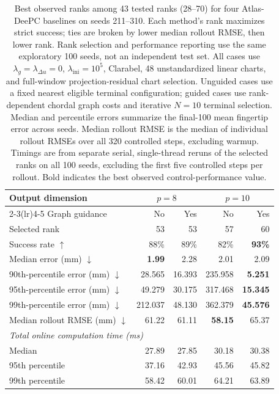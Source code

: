 \begin{table}[htbp]
    \centering
    \small
    \begin{tabular}{lrrrr}
        \toprule
        Output dimension & \multicolumn{2}{c}{$p=8$} & \multicolumn{2}{c}{$p=10$} \\
        \cmidrule(lr){2-3}\cmidrule(lr){4-5}
        Graph guidance & No & Yes & No & Yes \\
        \midrule
        Selected rank & 53 & 53 & 57 & 60 \\
        Success rate $\uparrow$ & 88\% & 89\% & 82\% & \textbf{93\%} \\
        Median error (mm) $\downarrow$ & \textbf{1.99} & 2.28 & 2.01 & 2.09 \\
        90th-percentile error (mm) $\downarrow$ & 28.565 & 16.393 & 235.958 & \textbf{5.251} \\
        95th-percentile error (mm) $\downarrow$ & 49.279 & 30.175 & 317.468 & \textbf{15.345} \\
        99th-percentile error (mm) $\downarrow$ & 212.037 & 48.130 & 362.379 & \textbf{45.576} \\
        Median rollout RMSE (mm) $\downarrow$ & 61.22 & 61.11 & \textbf{58.15} & 65.37 \\
        \midrule
        \multicolumn{5}{l}{\textit{Total online computation time (ms)}} \\
        Median & 27.89 & 27.85 & 30.18 & 30.38 \\
        95th percentile & 37.16 & 42.93 & 45.56 & 45.82 \\
        99th percentile & 58.42 & 60.01 & 64.21 & 63.89 \\
        \bottomrule
    \end{tabular}
    \caption{Best observed ranks among 43 tested ranks (28--70) for four Atlas-DeePC baselines on seeds 211--310. Each method's rank maximizes strict success; ties are broken by lower median rollout RMSE, then lower rank. Rank selection and performance reporting use the same exploratory 100 seeds, not an independent test set. All cases use $\lambda_g=\lambda_{\Delta u}=0$, $\lambda_{\mathrm{ini}}=10^5$, Clarabel, 48 unstandardized linear charts, and full-window projection-residual chart selection. Unguided cases use a fixed nearest eligible terminal configuration; guided cases use rank-dependent chordal graph costs and iterative $N=10$ terminal selection. Median and percentile errors summarize the final-100 mean fingertip error across seeds. Median rollout RMSE is the median of individual rollout RMSEs over all 320 controlled steps, excluding warmup. Timings are from separate serial, single-thread reruns of the selected ranks on all 100 seeds, excluding the first five controlled steps per rollout. Bold indicates the best observed control-performance value.}
    \label{tab:four-baselines-selected-ranks}
\end{table}
